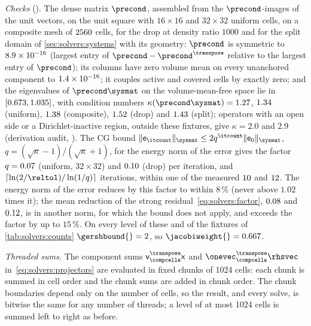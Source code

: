 \emph{Checks} (). The dense matrix $\precond$,
assembled from the $\precond$-images of the unit vectors, on the unit square
with $16\times16$ and $32\times32$ uniform cells, on a composite mesh of
$2560$ cells, for the drop at density ratio $1000$ and for the
split domain of \cref{sec:solvers:systems} with its geometry: $\precond$ is
symmetric to $8.9\times10^{-16}$ (largest entry of
$\precond-\precond^{\transpose}$ relative to the largest entry of
$\precond$); its columns have zero volume mean on every unanchored component to
$1.4\times10^{-16}$; it couples active and covered cells by exactly zero; and
the eigenvalues of $\precond\sysmat$ on the volume-mean-free space lie in
$[0.673,1.035]$, with condition numbers
$\kappa(\precond\sysmat)=\chkSolvKappaUniformA$, $1.34$
(uniform), $1.38$ (composite), $1.52$ (drop) and
$1.43$ (split); operators with an open side or a
Dirichlet-inactive region, outside these fixtures, give $\kappa=2.0$ and $2.9$
(derivation audit, ). The CG bound
$\norm{\mathsf e_{\itcount}}_{\sysmat}\le2q^{\itcount}\norm{\mathsf e_0}_{\sysmat}$,
$q=(\sqrt\kappa-1)/(\sqrt\kappa+1)$, for the energy norm of the error gives
the factor $q=0.07$ (uniform, $32\times32$) and
$0.10$ (drop) per iteration, and
$\lceil\ln(2/\reltol)/\ln(1/q)\rceil$ iterations, within one of the measured
$10$ and $12$. The energy norm of the error reduces
by this factor to within $8\,\%$ (never above $1.02$ times it); the mean
reduction of the strong residual~\cref{eq:solvers:factor},
$0.08$ and $0.12$, is in another norm, for
which the bound does not apply, and exceeds the factor by up to $15\,\%$. On
every level of these and of the fixtures of \cref{tab:solvers:counts}
$\gershbound{}=2$, so $\jacobiweight{}=\chkSolvOmegaUniform$.

\emph{Threaded sums.} The component sums
$\mathsf{v}_{\compcells}^{\transpose}\mathsf{x}$ and
$\onevec_{\compcells}^{\transpose}\rhsvec$ in~\eqref{eq:solvers:projectors}
are evaluated in fixed chunks of 1024 cells: each chunk is summed in cell
order and the chunk sums are added in chunk order. The chunk boundaries depend
only on the number of cells, so the result, and every solve, is bitwise the
same for any number of threads; a level of at most 1024 cells is summed
left to right as before.

